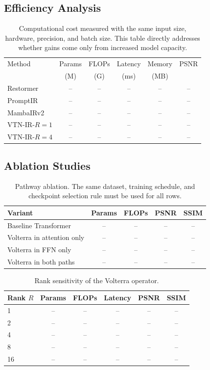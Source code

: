 \documentclass[10pt,twocolumn]{article}
\newcommand{\ours}{VTN-IR}
\begin{document}
\subsection{Efficiency Analysis}
\begin{table}[t]
\centering
\caption{Computational cost measured with the same input size, hardware, precision, and batch size. This table directly addresses whether gains come only from increased model capacity.}
\label{tab:efficiency}
\small
\begin{tabular}{lccccc}
\toprule
Method & Params & FLOPs & Latency & Memory & PSNR \\
 & (M) & (G) & (ms) & (MB) & \\
\midrule
Restormer & -- & -- & -- & -- & -- \\
PromptIR & -- & -- & -- & -- & -- \\
MambaIRv2 & -- & -- & -- & -- & -- \\
\ours-$R{=}1$ & -- & -- & -- & -- & -- \\
\ours-$R{=}4$ & -- & -- & -- & -- & -- \\
\bottomrule
\end{tabular}
\end{table}

\subsection{Ablation Studies}
\begin{table}[t]
\centering
\caption{Pathway ablation. The same dataset, training schedule, and checkpoint selection rule must be used for all rows.}
\label{tab:path_ablation}
\small
\begin{tabular}{lcccc}
\toprule
Variant & Params & FLOPs & PSNR & SSIM \\
\midrule
Baseline Transformer & -- & -- & -- & -- \\
Volterra in attention only & -- & -- & -- & -- \\
Volterra in FFN only & -- & -- & -- & -- \\
Volterra in both paths & -- & -- & -- & -- \\
\bottomrule
\end{tabular}
\end{table}

\begin{table}[t]
\centering
\caption{Rank sensitivity of the Volterra operator.}
\label{tab:rank}
\small
\begin{tabular}{lccccc}
\toprule
Rank $R$ & Params & FLOPs & Latency & PSNR & SSIM \\
\midrule
1 & -- & -- & -- & -- & -- \\
2 & -- & -- & -- & -- & -- \\
4 & -- & -- & -- & -- & -- \\
8 & -- & -- & -- & -- & -- \\
16 & -- & -- & -- & -- & -- \\
\bottomrule
\end{tabular}
\end{table}
\end{document}
